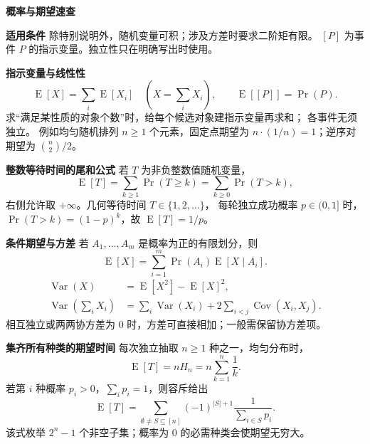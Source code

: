 \textbf{概率与期望速查}

\textbf{适用条件}
除特别说明外，随机变量可积；涉及方差时要求二阶矩有限。
$[P]$ 为事件 $P$ 的指示变量。独立性只在明确写出时使用。

\textbf{指示变量与线性性}
\[
\operatorname{E}[X]=\sum_i\operatorname{E}[X_i]\quad(X=\sum_iX_i),\qquad
\operatorname{E}[[P]]=\Pr(P).
\]
求“满足某性质的对象个数”时，给每个候选对象建指示变量再求和；
各事件无须独立。
例如均匀随机排列 $n\ge1$ 个元素，固定点期望为
$n\cdot(1/n)=1$；逆序对期望为 $\binom n2/2$。

\textbf{整数等待时间的尾和公式}
若 $T$ 为非负整数值随机变量，
\[
\operatorname{E}[T]=\sum_{k\ge1}\Pr(T\ge k)
=\sum_{k\ge0}\Pr(T>k),
\]
右侧允许取 $+\infty$。几何等待时间 $T\in\{1,2,\ldots\}$，
每轮独立成功概率 $p\in(0,1]$ 时，
$\Pr(T>k)=(1-p)^k$，故 $\operatorname{E}[T]=1/p$。

\textbf{条件期望与方差}
若 $A_1,\ldots,A_m$ 是概率为正的有限划分，则
\[
\operatorname{E}[X]=\sum_{i=1}^m\Pr(A_i)\operatorname{E}[X\mid A_i].
\]
\[
\begin{aligned}
\operatorname{Var}(X)&=\operatorname{E}[X^2]-\operatorname{E}[X]^2,\\
\operatorname{Var}\!\left(\sum_iX_i\right)
&=\sum_i\operatorname{Var}(X_i)
+2\sum_{i<j}\operatorname{Cov}(X_i,X_j).
\end{aligned}
\]
相互独立或两两协方差为 $0$ 时，方差可直接相加；一般需保留协方差项。

\textbf{集齐所有种类的期望时间}
每次独立抽取 $n\ge1$ 种之一，均匀分布时，
\[
\operatorname{E}[T]=nH_n=n\sum_{k=1}^{n}\frac1k.
\]
若第 $i$ 种概率 $p_i>0$，$\sum_i p_i=1$，则容斥给出
\[
\operatorname{E}[T]=
\sum_{\emptyset\ne S\subseteq[n]}
(-1)^{|S|+1}\frac1{\sum_{i\in S}p_i}.
\]
该式枚举 $2^n-1$ 个非空子集；概率为 $0$ 的必需种类会使期望无穷大。
